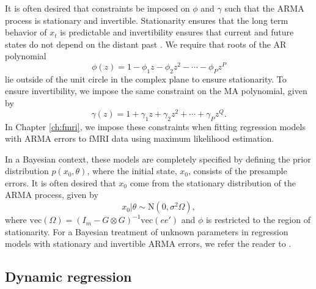 It is often desired that constraints be imposed on $\phi$ and $\gamma$ such that the ARMA process is stationary and invertible. Stationarity ensures that the long term behavior of $x_t$ is predictable and invertibility ensures that current and future states do not depend on the distant past \citep{shum:stof:2006:timeseries}. We require that roots of the AR polynomial
\[\phi(z) = 1 - \phi_1z - \phi_2z^2 - \cdots - \phi_Pz^P\]
lie outside of the unit circle in the complex plane to ensure stationarity. To ensure invertibility, we impose the same constraint on the MA polynomial, given by
\[\gamma(z) = 1 + \gamma_1z + \gamma_2z^2 + \cdots + \gamma_Pz^Q.\]
In Chapter \ref{ch:fmri}, we impose these constraints when fitting regression models with ARMA errors to fMRI data using maximum likelihood estimation.

In a Bayesian context, these models are completely specified by defining the prior distribution $p(x_0, \theta)$, where the initial state, $x_0$, consists of the presample errors. It is often desired that $x_0$ come from the stationary distribution of the ARMA process, given by
\begin{equation}
x_0|\theta \sim \mbox{N}(0, \sigma^2\Omega), \label{eqn:arma:prior}
\end{equation}
where $\mbox{vec}(\Omega) = (I_m - G\otimes G)^{-1} \mbox{vec}(ee')$ and $\phi$ is restricted to the region of stationarity. For a Bayesian treatment of unknown parameters in regression models with stationary and invertible ARMA errors, we refer the reader to \citet{chib:greenberg:1994:arma}.

\subsection{Dynamic regression \label{sec:dlm:arwn}}

